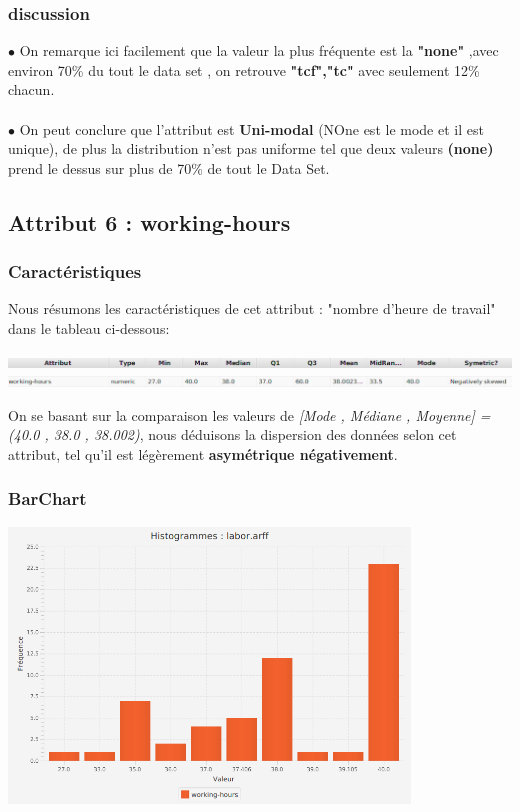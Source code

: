 \documentclass[12pt,a4paper,oneside]{book}
\begin{document}
\subsubsection{discussion}
$\bullet$ On remarque ici facilement que la valeur la plus fréquente est la \textbf{"none"} ,avec environ 70\% du tout le data set , on retrouve \textbf{"tcf","tc"} avec seulement 12\% chacun.\\
\textbf{ }\\
$\bullet$ On peut conclure que l'attribut est \textbf{Uni-modal }(NOne est le mode et il est unique), de plus la distribution n'est pas uniforme  tel que deux valeurs \textbf{(none)} prend le dessus sur plus de 70\% de tout le Data Set.


\newpage

\subsection{Attribut 6 : working-hours }
\subsubsection{Caractéristiques}
Nous résumons les caractéristiques de cet attribut : "nombre d'heure de travail" dans le tableau ci-dessous:
\begin{center}
	\includegraphics[width=1\textwidth]{screens/att.png}\\ \includegraphics[width=1\textwidth]{screens/att-6.png}%
	\label{labelname}%
\end{center}
On se basant sur la comparaison les valeurs de \textit{[Mode , Médiane , Moyenne] = (40.0 , 38.0 , 38.002)}, nous déduisons la dispersion des données selon cet attribut, tel qu'il est légèrement \textbf{asymétrique négativement}.

\subsubsection{BarChart}
\begin{center}
	\includegraphics[width=0.8\textwidth]{screens/barchart/working-hours-barchart.png}%
	\label{labelname}%
\end{center}
\end{document}
